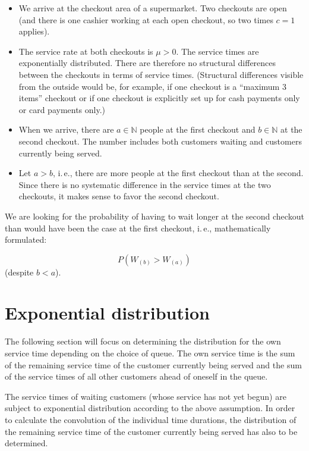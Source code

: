 \documentclass[a4paper,11pt,oneside]{article}
\begin{document}
\begin{itemize}
\item
We arrive at the checkout area of a supermarket. Two checkouts are open (and there is one cashier working at each open checkout, so two times $c=1$ applies).
\item
The service rate at both checkouts is $\mu>0$. The service times are exponentially distributed. There are therefore no structural differences between the checkouts in terms of service times. (Structural differences visible from the outside would be, for example, if one checkout is a “maximum 3 items” checkout or if one checkout is explicitly set up for cash payments only or card payments only.)
\item
When we arrive, there are $a\in\mathbb{N}$ people at the first checkout and $b\in\mathbb{N}$ at the second checkout. The number includes both customers waiting and customers currently being served.
\item
Let $a>b$, i.\,e., there are more people at the first checkout than at the second. Since there is no systematic difference in the service times at the two checkouts, it makes sense to favor the second checkout.
\end{itemize}

We are looking for the probability of having to wait longer at the second checkout than would have been the case at the first checkout, i.\,e., mathematically formulated:

$$
P(W_{(b)}>W_{(a)})
$$
(despite $b<a$).



\section{Exponential distribution}

The following section will focus on determining the distribution for the own service time depending on the choice of queue. The own service time is the sum of the remaining service time of the customer currently being served and the sum of the service times of all other customers ahead of oneself in the queue.

The service times of waiting customers (whose service has not yet begun) are subject to exponential distribution according to the above assumption. In order to calculate the convolution of the individual time durations, the distribution of the remaining service time of the customer currently being served has also to be determined.
\end{document}
